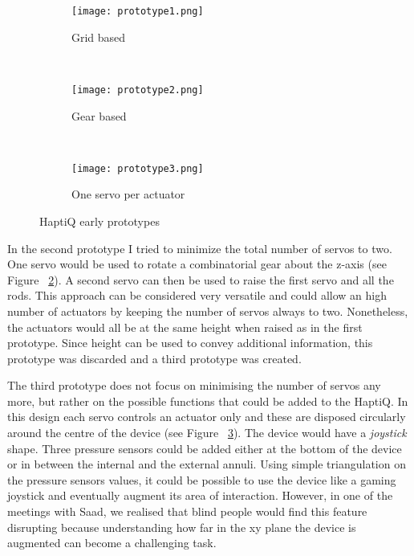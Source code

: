\begin{figure}
        \centering
        \begin{subfigure}[H]{0.5\textwidth}
                \texttt{[image: prototype1.png]}
                \caption{Grid based}
                \label{fig:first prototype}
        \end{subfigure}%
        ~ %
        \begin{subfigure}[H]{0.5\textwidth}
                \texttt{[image: prototype2.png]}
                \caption{Gear based}
                \label{fig:second prototype}
        \end{subfigure}
        ~ %
        \begin{subfigure}[H]{0.5\textwidth}
                \texttt{[image: prototype3.png]}
                \caption{One servo per actuator}
                \label{fig:third prototype}
        \end{subfigure}
        \caption{HaptiQ early prototypes}\label{fig:HaptiQ-early-prototypes}
\end{figure}

In the second prototype I tried to minimize the total number of servos to two. One servo would be used to rotate a combinatorial gear about the z-axis (see Figure ~\ref{fig:second prototype}). A second servo can then be used to raise the first servo and all the rods. This approach can be considered very versatile and could allow an high number of actuators by keeping the number of servos always to two. Nonetheless, the actuators would all be at the same height when raised as in the first prototype. Since height can be used to convey additional information, this prototype was discarded and a third prototype was created.

The third prototype does not focus on minimising the number of servos any more, but rather on the possible functions that could be added to the HaptiQ. In this design each servo controls an actuator only and these are disposed circularly around the centre of the device (see Figure ~\ref{fig:third prototype}). The device would have a \textit{joystick} shape. Three pressure sensors could be added either at the bottom of the device or in between the internal and the external annuli. Using simple triangulation on the pressure sensors values, it could be possible to use the device like a gaming joystick and eventually augment its area of interaction. However, in one of the meetings with Saad, we realised that blind people would find this feature disrupting because understanding how far in the xy plane the device is augmented can become a challenging task. 

